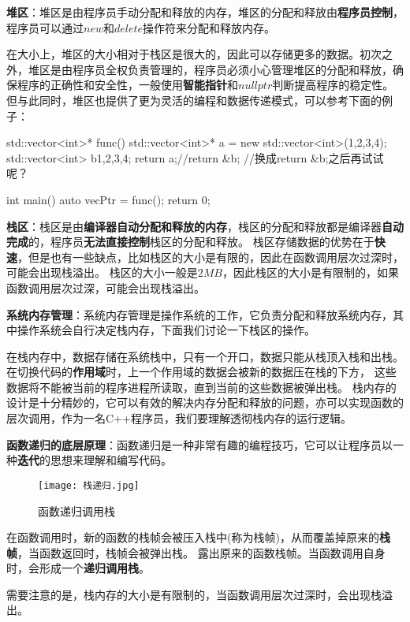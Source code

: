 \textbf{堆区}：堆区是由程序员手动分配和释放的内存，堆区的分配和释放由\textbf{程序员控制}，程序员可以通过$new$和$delete$操作符来分配和释放内存。

在大小上，堆区的大小相对于栈区是很大的，因此可以存储更多的数据。初次之外，堆区是由程序员全权负责管理的，程序员必须小心管理堆区的分配和释放，确保程序的正确性和安全性，一般使用\textbf{智能指针}和$nullptr$判断提高程序的稳定性。
但与此同时，堆区也提供了更为灵活的编程和数据传递模式，可以参考下面的例子：
\begin{tcode}
std::vector<int>* func(){
    std::vector<int>* a = new std::vector<int>({1,2,3,4});
    std::vector<int> b{1,2,3,4};
    return a;//return &b;
    //换成return &b;之后再试试呢？
}

int main() {
    auto vecPtr = func();
    return 0;
}
\end{tcode}

\textbf{栈区}：栈区是由\textbf{编译器自动分配和释放的内存}，栈区的分配和释放都是编译器\textbf{自动完成}的，程序员\textbf{无法直接控制}栈区的分配和释放。
栈区存储数据的优势在于\textbf{快速}，但是也有一些缺点，比如栈区的大小是有限的，因此在函数调用层次过深时，可能会出现栈溢出。
栈区的大小一般是$2MB$，因此栈区的大小是有限制的，如果函数调用层次过深，可能会出现栈溢出。

\textbf{系统内存管理}：系统内存管理是操作系统的工作，它负责分配和释放系统内存，其中操作系统会自行决定栈内存，下面我们讨论一下栈区的操作。

在栈内存中，数据存储在系统栈中，只有一个开口，数据只能从栈顶入栈和出栈。在切换代码的\textbf{作用域}时，上一个作用域的数据会被新的数据压在栈的下方，
这些数据将不能被当前的程序进程所读取，直到当前的这些数据被弹出栈。
栈内存的设计是十分精妙的，它可以有效的解决内存分配和释放的问题，亦可以实现函数的层次调用，作为一名C++程序员，我们要理解透彻栈内存的运行逻辑。

\textbf{函数递归的底层原理}：函数递归是一种非常有趣的编程技巧，它可以让程序员以一种\textbf{迭代}的思想来理解和编写代码。

\begin{figure}[H]
    \centering
    \texttt{[image: 栈递归.jpg]}
    \caption{函数递归调用栈} %
    \label{fig:栈递归} %
\end{figure}

在函数调用时，新的函数的栈帧会被压入栈中(称为栈帧)，从而覆盖掉原来的\textbf{栈帧}，当函数返回时，栈帧会被弹出栈。
露出原来的函数栈帧。当函数调用自身时，会形成一个\textbf{递归调用栈}。

需要注意的是，栈内存的大小是有限制的，当函数调用层次过深时，会出现栈溢出。

